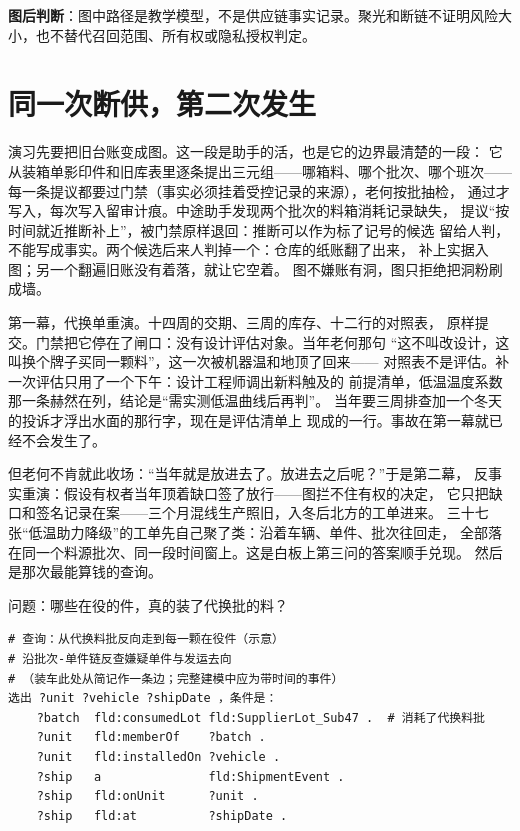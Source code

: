 \begin{noteblock}
\textbf{图后判断}：图中路径是教学模型，不是供应链事实记录。聚光和断链不证明风险大小，也不替代召回范围、所有权或隐私授权判定。
\end{noteblock}

\section{同一次断供，第二次发生}

演习先要把旧台账变成图。这一段是助手的活，也是它的边界最清楚的一段：
它从装箱单影印件和旧库表里逐条提出三元组——哪箱料、哪个批次、哪个班次——
每一条提议都要过门禁（事实必须挂着受控记录的来源），老何按批抽检，
通过才写入，每次写入留审计痕。中途助手发现两个批次的料箱消耗记录缺失，
提议“按时间就近推断补上”，被门禁原样退回：推断可以作为标了记号的候选
留给人判，不能写成事实。两个候选后来人判掉一个：仓库的纸账翻了出来，
补上实据入图；另一个翻遍旧账没有着落，就让它空着。
图不嫌账有洞，图只拒绝把洞粉刷成墙。

第一幕，代换单重演。十四周的交期、三周的库存、十二行的对照表，
原样提交。门禁把它停在了闸口：没有设计评估对象。当年老何那句
“这不叫改设计，这叫换个牌子买同一颗料”，这一次被机器温和地顶了回来——
对照表不是评估。补一次评估只用了一个下午：设计工程师调出新料触及的
前提清单，低温温度系数那一条赫然在列，结论是“需实测低温曲线后再判”。
当年要三周排查加一个冬天的投诉才浮出水面的那行字，现在是评估清单上
现成的一行。事故在第一幕就已经不会发生了。

但老何不肯就此收场：“当年就是放进去了。放进去之后呢？”于是第二幕，
反事实重演：假设有权者当年顶着缺口签了放行——图拦不住有权的决定，
它只把缺口和签名记录在案——三个月混线生产照旧，入冬后北方的工单进来。
三十七张“低温助力降级”的工单先自己聚了类：沿着车辆、单件、批次往回走，
全部落在同一个料源批次、同一段时间窗上。这是白板上第三问的答案顺手兑现。
然后是那次最能算钱的查询。

问题：哪些在役的件，真的装了代换批的料？

\nopagebreak[4]
\begin{codebox}
\begin{Verbatim}[fontsize=\small,breaklines=true,breakanywhere=true,breaksymbolleft={},breaksymbolright={}]
# 查询：从代换料批反向走到每一颗在役件（示意）
# 沿批次-单件链反查嫌疑单件与发运去向
# （装车此处从简记作一条边；完整建模中应为带时间的事件）
选出 ?unit ?vehicle ?shipDate ，条件是：
    ?batch  fld:consumedLot fld:SupplierLot_Sub47 .  # 消耗了代换料批
    ?unit   fld:memberOf    ?batch .
    ?unit   fld:installedOn ?vehicle .
    ?ship   a               fld:ShipmentEvent .
    ?ship   fld:onUnit      ?unit .
    ?ship   fld:at          ?shipDate .
\end{Verbatim}
\end{codebox}

